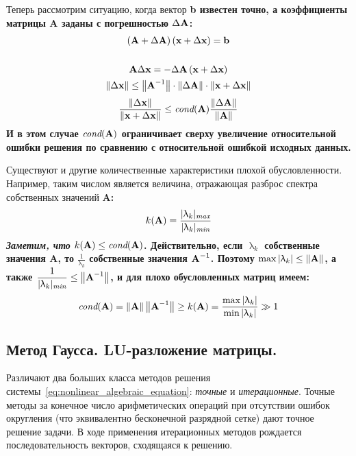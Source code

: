 Теперь рассмотрим ситуацию, когда вектор \bf{b} известен точно, а коэффициенты матрицы \bf{A} заданы с погрешностью
$\Delta \bf{A}$:
\begin{gather*}
    \left( \bf{A} + \Delta \bf{A} \right)\left( \bf{x} + \Delta \bf{x} \right) = \bf{b}\\
    \\
    \bf{A}\Delta \bf{x} = - \Delta \bf{A} \left( \bf{x} + \Delta \bf{x} \right)\\
    \left\| \Delta \bf{x} \right\| \leq \left\| \bf{A}^{-1} \right\| \cdot \left\| \Delta \bf{A} \right\| \cdot \left\| \bf{x} + \Delta \bf{x} \right\|
\end{gather*}
\begin{equation}
    \frac{\left\| \Delta \bf{x} \right\|}{\left\| \bf{x} + \Delta \bf{x} \right\|} \leq \textit{cond}(\bf{A}) \frac{\left\| \Delta \bf{A} \right\|}{\left\| \bf{A} \right\|}
\end{equation}
И в этом случае $\textit{cond}(\bf{A})$ ограничивает сверху увеличение относительной ошибки решения по сравнению с
относительной ошибкой исходных данных.
\vspace{10pt}

Существуют и другие количественные характеристики плохой обусловленности. Например, таким числом является величина,
отражающая разброс спектра собственных значений \bf{A}:
\begin{equation*}
    k(\bf{A}) = \frac{\displaystyle |\uplambda_k|_{\textit{max}}}{\displaystyle |\uplambda_k|_{\textit{min}}}
\end{equation*}
\emph{Заметим, что} $k(\bf{A}) \leq \textit{cond}(\bf{A})$. Действительно, если $\uplambda_k$ собственные значения \bf{A},
то $\displaystyle \frac{1}{\uplambda_k}$ собственные значения $\bf{A}^{-1}$. Поэтому
$\displaystyle \max |\uplambda_k| \leq \left\| \bf{A} \right\|$, а также $\displaystyle \frac{1}{|\uplambda_k|_{\textit{min}}} \leq \left\| \bf{A}^{-1} \right\|$,
и для плохо обусловленных матриц имеем:
\begin{equation*}
    \textit{cond}(\bf{A}) = \left\| \bf{A} \right\| \left\| \bf{A}^{-1} \right\| \geq k(\bf{A}) = \frac{\max|\uplambda_k|}{\min|\uplambda_k|} \gg 1
\end{equation*}

\subsection{Метод Гаусса. \textbf{LU}-разложение матрицы.}
Различают два больших класса методов решения системы~\eqref{eq:nonlinear_algebraic_equation}: \emph{точные} и
\emph{итерационные}. Точные методы за конечное число арифметических операций при отсутствии ошибок округления (что
эквивалентно бесконечной разрядной сетке) дают точное решение задачи. В ходе применения итерационных методов рождается
последовательность векторов, сходящаяся к решению.

